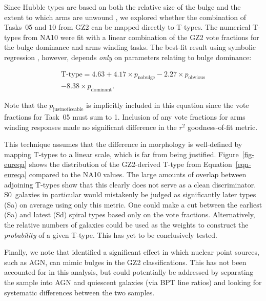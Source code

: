 \documentclass[useAMS,usenatbib]{mn2e}
\begin{document}

Since Hubble types are based on both the relative size of the bulge and the extent to which arms are unwound \citep{hub36}, we explored whether the combination of Tasks~05 and 10 from GZ2 can be mapped directly to T-types. The numerical T-types from NA10 were fit with a linear combination of the GZ2 vote fractions for the bulge dominance and arms winding tasks. The best-fit result using symbolic regression \citep{sch09c}, however, depends {\em only} on parameters relating to bulge dominance:

\begin{eqnarray}
\label{eqn-eureqa}
\text{T-type} = 4.63 + 4.17\times p_\mathrm{no bulge} - 2.27\times p_\mathrm{obvious} \\ \nonumber
- 8.38\times p_\mathrm{dominant}.
\end{eqnarray}

\noindent Note that the $p_\mathrm{just noticeable}$ is implicitly included in this equation since the vote fractions for Task~05 must sum to 1. Inclusion of any vote fractions for arms winding responses made no significant difference in the $r^2$ goodness-of-fit metric.

This technique assumes that the difference in morphology is well-defined by mapping T-types to a linear scale, which is far from being justified. Figure~\ref{fig-eureqa} shows the distribution of the GZ2-derived T-type from Equation~\ref{eqn-eureqa} compared to the NA10 values. The large amounts of overlap between adjoining T-types show that this clearly does not serve as a clean discriminator. S0~galaxies in particular would mistakenly be judged as significantly later types (Sa) on average using only this metric. One could make a cut between the earliest (Sa) and latest (Sd) spiral types based only on the vote fractions. Alternatively, the relative numbers of galaxies could be used as the weights to construct the {\em probability} of a given T-type. This has yet to be conclusively tested. 

Finally, we note that \citet{sim13} identified a significant effect in which nuclear point sources, such as AGN, can mimic bulges in the GZ2 classifications. This has not been accounted for in this analysis, but could potentially be addressed by separating the sample into AGN and quiescent galaxies (via BPT line ratios) and looking for systematic differences between the two samples. 
\end{document}
